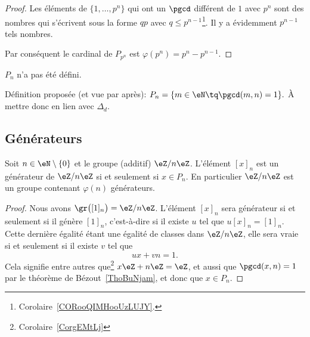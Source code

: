 \begin{proof}
	Les éléments de \( \{ 1,\ldots,p^n \}\) qui ont un \( \pgcd\) différent de \( 1\) avec \( p^n\) sont des nombres qui s'écrivent sous la forme \( qp\) avec \( q\leq p^{n-1}\)\footnote{Corolaire~\ref{CORooQIMHooUzLUJY}.}. Il y a évidemment \( p^{n-1}\) tels nombres.

	Par conséquent le cardinal de \( P_{p^n}\) est \( \varphi(p^{n})=p^n-p^{n-1}\).
\end{proof}

\begin{probleme}
	\( P_n\) n'a pas été défini.

	Définition proposée (et vue par après): \( P_n = \{ m \in \eN \tq \pgcd(m,n) = 1 \}. \) À mettre donc en lien avec \( \Delta_d\).
\end{probleme}

\subsection{Générateurs}

\begin{proposition}     \label{PropZnmuphiGensn}
	Soit \( n\in\eN\setminus\{ 0 \}\) et le groupe (additif) \( \eZ/n\eZ\). L'élément \( [x]_n\) est un générateur de \( \eZ/n\eZ\) si et seulement si \( x\in P_n\). En particulier \( \eZ/n\eZ\) est un groupe contenant \( \varphi(n)\) générateurs.
\end{proposition}

\begin{proof}
	Nous avons \( \gr\big( [1]_n \big)=\eZ/n\eZ\). L'élément \( [x]_n\) sera générateur si et seulement si il génère \( [1]_n \), c'est-à-dire si il existe \( u\) tel que \( u[x]_n=[1]_n\). Cette dernière égalité étant une égalité de classes dans \( \eZ/n\eZ\), elle sera vraie si et seulement si il existe \( v\) tel que
	\begin{equation}
		ux+vn=1.
	\end{equation}
	Cela signifie entre autres que\footnote{Corolaire~\ref{CorgEMtLj}} \( x\eZ+n\eZ=\eZ\), et aussi que \( \pgcd(x,n)=1\) par le théorème de Bézout~\ref{ThoBuNjam}, et donc que \( x\in P_n\).
\end{proof}

